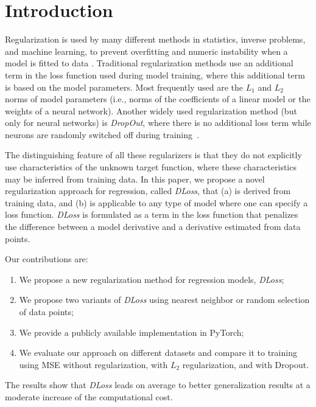 \documentclass[conference]{IEEEtran}
\begin{document}
\nopagebreak
\section{Introduction}
\label{introduction}

Regularization is used by many different methods in statistics, inverse problems, and machine learning, to prevent overfitting and numeric instability when a model is fitted to data \cite{Kukacka2017regsurvey}.
Traditional regularization methods use an additional term in the loss function used during model training, where this additional term is based on the model parameters. 
Most frequently used are the $L_1$ \cite{tibshirani1996L1} and $L_2$~\cite{TikhonovL2} norms of model parameters (i.e., norms of the coefficients of a linear model or the weights of a neural network). 
Another widely used regularization method (but only for neural networks) is \emph{DropOut}, where there is no additional loss term while neurons are randomly switched off during training~\cite{hinton2012L2,srivastava2014dropout}.

The distinguishing feature of all these regularizers is that they do not explicitly use characteristics of the unknown target function, where these characteristics may be inferred from training data. 
In this paper, we propose a novel regularization approach for regression, called \emph{DLoss}, that (a) is derived from training data, and (b) is applicable to any type of model where one can specify a loss function.
\emph{DLoss} is formulated as a term in the loss function that penalizes the difference between a model derivative and a derivative estimated from data points. 

Our contributions are:
\begin{enumerate}
 \item We propose a new regularization method for regression models, \emph{DLoss};
 \item We propose two variants of \emph{DLoss} using nearest neighbor or random selection of data points;
 \item We provide a publicly available implementation in PyTorch;
 \item We evaluate our approach on different datasets and compare it to training using MSE without regularization, with $L_2$ regularization, and with Dropout.
\end{enumerate}
The results show that \emph{DLoss} leads on average to better generalization results at a moderate increase of the computational cost. 
\end{document}
